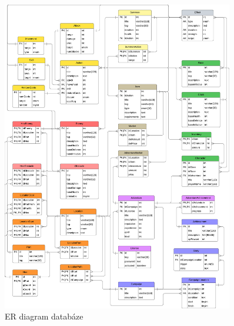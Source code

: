 \begin{figure}[h]
    \centering
    \includegraphics[width=0.9\textwidth]{../../shared/diagrams/dbScheme.pdf}
    \caption{ER diagram databáze}
    \label{fig:dix:database_schema}
\end{figure}